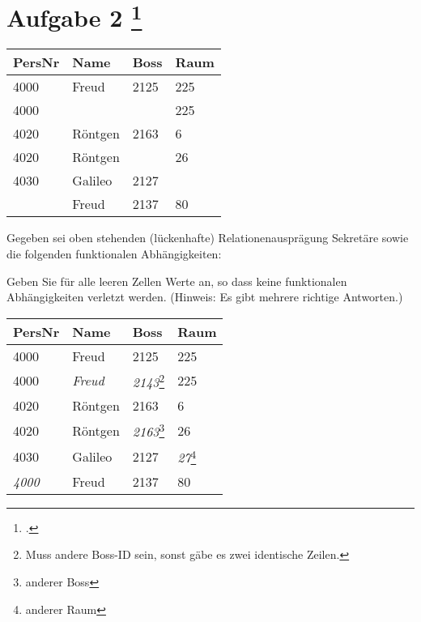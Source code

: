 \documentclass{lehramt-informatik-aufgabe}
\begin{document}
\section{Aufgabe 2
\footcite{66116:2020:03}}

\begin{center}
\begin{tabular}{|l|l|l|l|}
\hline
PersNr & Name    & Boss & Raum \\\hline
4000   & Freud   & 2125 & 225 \\\hline
4000   &         &      & 225 \\\hline
4020   & Röntgen & 2163 & 6 \\\hline
4020   & Röntgen &      & 26 \\\hline
4030   & Galileo & 2127 & \\\hline
       & Freud   & 2137 & 80 \\\hline
\end{tabular}
\end{center}

\noindent
Gegeben sei oben stehenden (lückenhafte) Relationenausprägung Sekretäre
sowie die folgenden funktionalen Abhängigkeiten:

\begin{center}

\end{center}

\noindent
Geben Sie für alle leeren Zellen Werte an, so dass keine funktionalen
Abhängigkeiten verletzt werden. (Hinweis: Es gibt mehrere richtige
Antworten.)

\begin{liAntwort}
\begin{center}
\begin{tabular}{|l|l|l|l|}
\hline
PersNr & Name    & Boss & Raum \\\hline
4000   & Freud   & 2125 & 225 \\\hline
4000   & \textit{Freud}   & \textit{2143}\footnote{Muss andere Boss-ID
sein, sonst gäbe es zwei identische Zeilen.} & 225 \\\hline
4020   & Röntgen & 2163 & 6 \\\hline
4020   & Röntgen & \textit{2163}\footnote{anderer Boss} & 26 \\\hline
4030   & Galileo & 2127 & \textit{27}\footnote{anderer Raum} \\\hline
\textit{4000}   & Freud   & 2137 & 80 \\\hline
\end{tabular}
\end{center}
\end{liAntwort}
\end{document}
